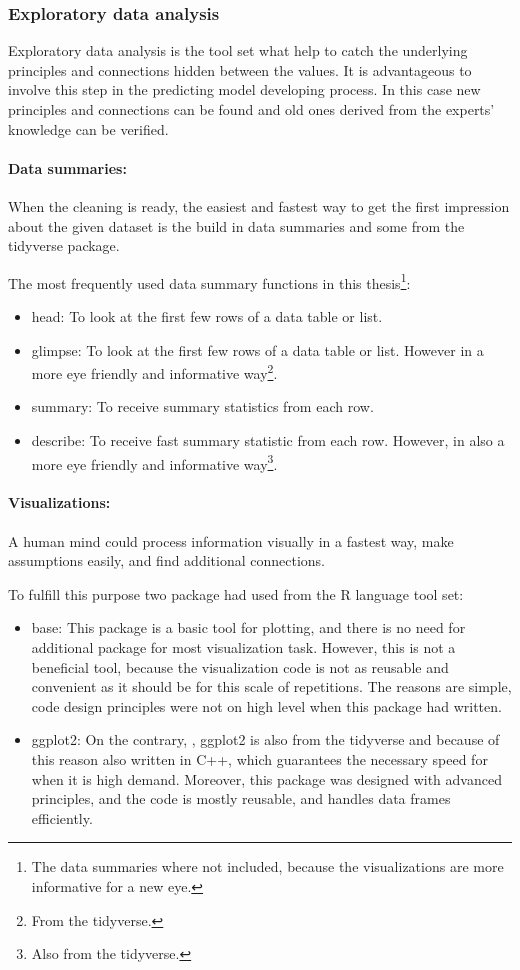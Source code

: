 	\subsubsection{Exploratory data analysis}
		Exploratory data analysis is the tool set what help to catch the underlying principles and connections hidden between the values. It is advantageous to involve this step in the predicting model developing process. In this case new principles and connections can be found and old ones derived from the experts' knowledge can be verified.
		\paragraph{Data summaries:}
		When the cleaning is ready, the easiest and fastest way to get the first impression about the given dataset is the build in data summaries and some from the tidyverse package.

		The most frequently used data summary functions in this thesis\footnote{The data summaries where not included, because the visualizations are more informative for a new eye.}:
		\begin{itemize}
			\item{head:} To look at the first few rows of a data table or list.
			\item{glimpse:} To look at the first few rows of a data table or list. However in a more eye friendly and informative way\footnote{From the tidyverse.}.
			\item{summary:} To receive summary statistics from each row.
			\item{describe:} To receive fast summary statistic from each row. However, in also a more eye friendly and informative way\footnote{Also from the tidyverse.}.
		\end{itemize}
		\paragraph{Visualizations:}
		A human mind could process information visually in a fastest way, make assumptions easily, and find additional connections. 

		To fulfill this purpose two package had used from the R language tool set:
		\begin{itemize}
			\item{base:} This package is a basic tool for plotting, and there is no need for additional package for most visualization task. However, this is not a beneficial tool, because the visualization code is not as reusable and convenient as it should be for this scale of repetitions. The reasons are simple, code design principles were not on high level when this package had written.
			\item{ggplot2:} On the contrary, , ggplot2 is also from the tidyverse and because of this reason also written in C++, which guarantees the necessary speed for when it is high demand. Moreover, this package was designed with advanced principles, and the code is mostly reusable, and handles data frames efficiently. 
		\end{itemize} 


